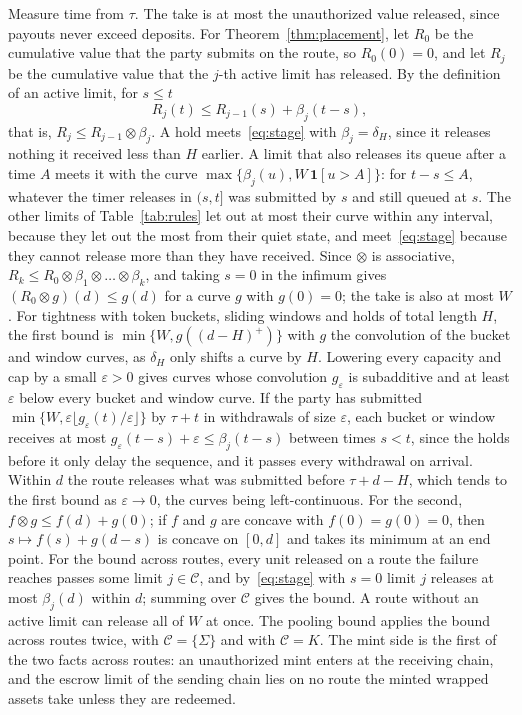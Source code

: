 \documentclass[conference,compsoc]{IEEEtran}
\numberwithin{equation}{section}
\theoremstyle{plain}
\theoremstyle{definition}
\theoremstyle{remark}
\begin{document}
Measure time from $\tau$. The take is at most the unauthorized value released, since payouts never exceed deposits. For Theorem~\ref{thm:placement}, let $R_0$ be the cumulative value that the party submits on the route, so $R_0(0) = 0$, and let $R_j$ be the cumulative value that the $j$-th active limit has released. By the definition of an active limit, for $s \le t$
\begin{equation}\label{eq:stage}
R_j(t) \le R_{j-1}(s) + \beta_j(t-s),
\end{equation}
that is, $R_j \le R_{j-1} \otimes \beta_j$. A hold meets~\eqref{eq:stage} with $\beta_j = \delta_H$, since it releases nothing it received less than $H$ earlier. A limit that also releases its queue after a time $A$ meets it with the curve $\max\{\beta_j(u), W\,\mathbf{1}[u > A]\}$: for $t - s \le A$, whatever the timer releases in $(s, t]$ was submitted by $s$ and still queued at $s$. The other limits of Table~\ref{tab:rules} let out at most their curve within any interval, because they let out the most from their quiet state, and meet~\eqref{eq:stage} because they cannot release more than they have received. Since $\otimes$ is associative, $R_k \le R_0 \otimes \beta_1 \otimes \dots \otimes \beta_k$, and taking $s = 0$ in the infimum gives $(R_0 \otimes g)(d) \le g(d)$ for a curve $g$ with $g(0) = 0$; the take is also at most $W$. For tightness with token buckets, sliding windows and holds of total length $H$, the first bound is $\min\{W, g((d - H)^+)\}$ with $g$ the convolution of the bucket and window curves, as $\delta_H$ only shifts a curve by $H$. Lowering every capacity and cap by a small $\varepsilon > 0$ gives curves whose convolution $g_\varepsilon$ is subadditive and at least $\varepsilon$ below every bucket and window curve. If the party has submitted $\min\{W, \varepsilon \lfloor g_\varepsilon(t)/\varepsilon \rfloor\}$ by $\tau + t$ in withdrawals of size $\varepsilon$, each bucket or window receives at most $g_\varepsilon(t - s) + \varepsilon \le \beta_j(t - s)$ between times $s < t$, since the holds before it only delay the sequence, and it passes every withdrawal on arrival. Within $d$ the route releases what was submitted before $\tau + d - H$, which tends to the first bound as $\varepsilon \to 0$, the curves being left-continuous. For the second, $f \otimes g \le f(d) + g(0)$; if $f$ and $g$ are concave with $f(0) = g(0) = 0$, then $s \mapsto f(s) + g(d-s)$ is concave on $[0, d]$ and takes its minimum at an end point. For the bound across routes, every unit released on a route the failure reaches passes some limit $j \in \mathcal{C}$, and by~\eqref{eq:stage} with $s = 0$ limit $j$ releases at most $\beta_j(d)$ within $d$; summing over $\mathcal{C}$ gives the bound. A route without an active limit can release all of $W$ at once. The pooling bound applies the bound across routes twice, with $\mathcal{C} = \{\Sigma\}$ and with $\mathcal{C} = K$. The mint side is the first of the two facts across routes: an unauthorized mint enters at the receiving chain, and the escrow limit of the sending chain lies on no route the minted wrapped assets take unless they are redeemed.
\end{document}
